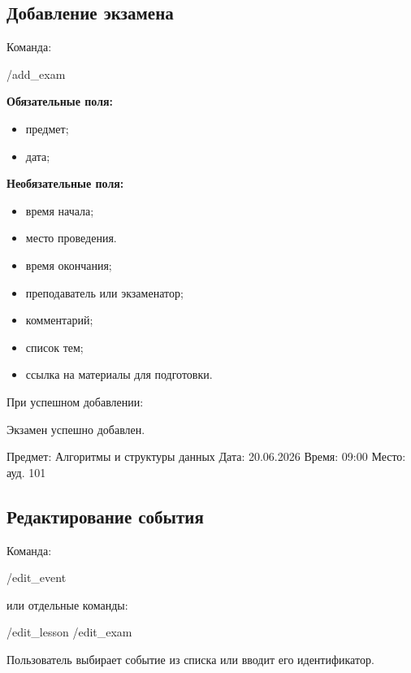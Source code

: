 \documentclass[10pt,a4paper,final]{article} %
\begin{document}
\subsection{Добавление экзамена}

Команда:

\begin{Code}
/add_exam
\end{Code}

\textbf{Обязательные поля:}

\begin{itemize}
    \item предмет;
    \item дата;

\end{itemize}

\textbf{Необязательные поля:}

\begin{itemize}
\item время начала;
    \item место проведения.
    \item время окончания;
    \item преподаватель или экзаменатор;
    \item комментарий;
    \item список тем;
    \item ссылка на материалы для подготовки.
\end{itemize}

При успешном добавлении:

\begin{Code}
Экзамен успешно добавлен.

Предмет: Алгоритмы и структуры данных
Дата: 20.06.2026
Время: 09:00
Место: ауд. 101
\end{Code}

\subsection{Редактирование события}

Команда:

\begin{Code}
/edit_event
\end{Code}

или отдельные команды:

\begin{Code}
/edit_lesson
/edit_exam
\end{Code}

Пользователь выбирает событие из списка или вводит его идентификатор.
\end{document}
